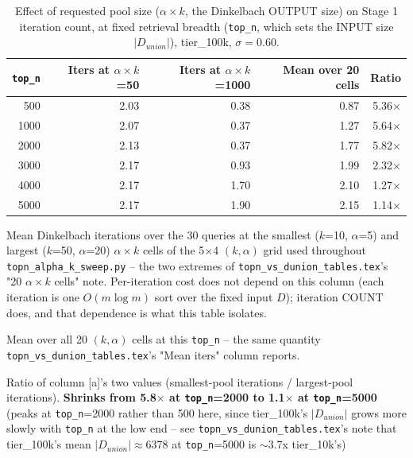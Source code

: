 \begin{table}[t]
\centering
\begin{threeparttable}
\caption{Effect of requested pool size ($\alpha{\times}k$, the Dinkelbach OUTPUT size) on Stage 1
iteration count, at fixed retrieval breadth (\texttt{top\_n}, which sets the INPUT size
$|D_{union}|$), tier\_100k, $\sigma=0.60$.}
\label{tab:wdc-dinkelbach-iters-by-output-tier100k}
\begin{tabular}{rrrrr}
\toprule
\texttt{top\_n} & Iters at $\alpha{\times}k$=50\tnote{a} & Iters at $\alpha{\times}k$=1000\tnote{a} & Mean over 20 cells\tnote{b} & Ratio\tnote{c} \\
\midrule
 500 & 2.03 & 0.38 & 0.87 & 5.36$\times$ \\
1000 & 2.07 & 0.37 & 1.27 & 5.64$\times$ \\
2000 & 2.13 & 0.37 & 1.77 & 5.82$\times$ \\
3000 & 2.17 & 0.93 & 1.99 & 2.32$\times$ \\
4000 & 2.17 & 1.70 & 2.10 & 1.27$\times$ \\
5000 & 2.17 & 1.90 & 2.15 & 1.14$\times$ \\
\bottomrule
\end{tabular}
\begin{tablenotes}
\footnotesize
\item[a] Mean Dinkelbach iterations over the 30 queries at the smallest ($k$=10, $\alpha$=5) and
  largest ($k$=50, $\alpha$=20) $\alpha{\times}k$ cells of the 5$\times$4 $(k,\alpha)$ grid used
  throughout \texttt{topn\_alpha\_k\_sweep.py} -- the two extremes of \texttt{topn\_vs\_dunion\_tables.tex}'s
  "20 $\alpha{\times}k$ cells" note. Per-iteration cost does not depend on this column (each
  iteration is one $O(m\log m)$ sort over the fixed input $D$); iteration COUNT does, and that
  dependence is what this table isolates.
\item[b] Mean over all 20 $(k,\alpha)$ cells at this \texttt{top\_n} -- the same quantity
  \texttt{topn\_vs\_dunion\_tables.tex}'s "Mean iters" column reports.
\item[c] Ratio of column [a]'s two values (smallest-pool iterations / largest-pool iterations).
  \textbf{Shrinks from 5.8$\times$ at \texttt{top\_n}=2000 to 1.1$\times$ at \texttt{top\_n}=5000}
  (peaks at \texttt{top\_n}=2000 rather than 500 here, since tier\_100k's $|D_{union}|$ grows more
  slowly with \texttt{top\_n} at the low end -- see \texttt{topn\_vs\_dunion\_tables.tex}'s note
  that tier\_100k's mean $|D_{union}|\approx$6378 at \texttt{top\_n}=5000 is $\sim$3.7x tier\_10k's)

\end{tablenotes}
\end{threeparttable}
\end{table}

